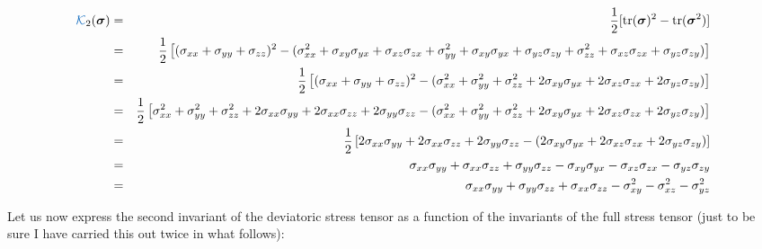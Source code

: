 \begin{eqnarray}
{\KKK}_2({\bm \sigma}) 
&=& \frac{1}{2}[{\rm tr}({\bm \sigma}) ^2 - {\rm tr}({\bm \sigma}^2)] \nonumber\\
&=& \frac12 \left[  (\sigma_{xx}+\sigma_{yy}+\sigma_{zz})^2  
- ( \sigma_{xx}^2 + \sigma_{xy}\sigma_{yx} + \sigma_{xz}\sigma_{zx}  
+\sigma_{yy}^2 + \sigma_{xy}\sigma_{yx} + \sigma_{yz}\sigma_{zy}
+\sigma_{zz}^2 + \sigma_{xz}\sigma_{zx} + \sigma_{yz}\sigma_{zy}
) \right] \nn\\
&=& \frac12 \left[  (\sigma_{xx}+\sigma_{yy}+\sigma_{zz})^2  
- ( \sigma_{xx}^2 +\sigma_{yy}^2 +\sigma_{zz}^2
+ 2\sigma_{xy}\sigma_{yx} + 2\sigma_{xz}\sigma_{zx}  + 2\sigma_{yz}\sigma_{zy} ) \right] \nn\\
&=& \frac12 \left[  
\sigma_{xx}^2 + \sigma_{yy}^2 + \sigma_{zz}^2
+2 \sigma_{xx}\sigma_{yy}
+2 \sigma_{xx}\sigma_{zz}
+ 2 \sigma_{yy}\sigma_{zz}
- ( \sigma_{xx}^2 +\sigma_{yy}^2 +\sigma_{zz}^2
+ 2\sigma_{xy}\sigma_{yx} + 2\sigma_{xz}\sigma_{zx}  + 2\sigma_{yz}\sigma_{zy} ) \right] \nn\\
&=& \frac12 \left[  
2 \sigma_{xx}\sigma_{yy}
+2 \sigma_{xx}\sigma_{zz}
+ 2 \sigma_{yy}\sigma_{zz}
- ( 2\sigma_{xy}\sigma_{yx} + 2\sigma_{xz}\sigma_{zx}  + 2\sigma_{yz}\sigma_{zy} ) \right] \nn\\
&=& 
\sigma_{xx}\sigma_{yy} + \sigma_{xx}\sigma_{zz} + \sigma_{yy}\sigma_{zz}
- \sigma_{xy}\sigma_{yx} - \sigma_{xz}\sigma_{zx}  - \sigma_{yz}\sigma_{zy} 
\\
&=& \sigma_{xx}\sigma_{yy}+\sigma_{yy}\sigma_{zz}+\sigma_{xx}\sigma_{zz}
-\sigma_{xy}^2 -\sigma_{xz}^2 -\sigma_{yz}^2 
\end{eqnarray}











\newpage
Let us now express the second invariant of the deviatoric stress tensor 
as a function of the invariants of the full stress tensor (just to be sure
I have carried this out twice in what follows): 

